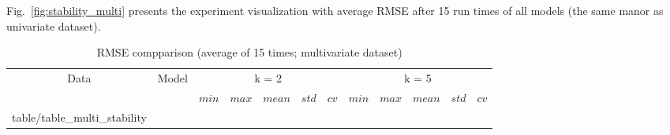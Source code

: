 \documentclass[review,3p,authoryear]{elsarticle}
\makeatletter
\newcommand\primitiveinput[1]
		{\@@input #1 }
\makeatother
\begin{document}
{Fig.~\ref{fig:stability_multi} presents the experiment visualization with average RMSE after 15 run times of all models (the same manor as univariate dataset).



\begin{table}[h]
	\caption{RMSE compparison (average of 15 times; multivariate dataset)}
	\label{table:multi_stability}
	\centering
	\begin{adjustbox}{width=\textwidth}
		\begin{tabular}{| c | c| c | c | c | c | c | c | c | c | c | c |}%
		\hline
			 \multirow{2}{*}{Data} & \multirow{2}{*}{Model} & \multicolumn{5}{c|}{k = 2} & \multicolumn{5}{c|}{ k = 5 } \\ 
			 \cline{3-12}
	   		& & $min$ & $max$ & $mean$ & $std$ & $cv$ &   $min$ & $max$ & $mean$ & $std$ & $cv$ \\ [0.5ex] 
		\hline
			\primitiveinput{table/table_multi_stability}
		\hline
		\end{tabular}
	\end{adjustbox}
\end{table}





}
\end{document}
